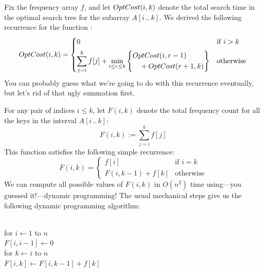 Fix the frequency array $f$, and let $OptCost(i, k)$ denote the total search time in the optimal search tree for the subarray $A[i\,..\,k]$.
We derived the following recurrence for the function :
\[
OptCost(i, k) = \begin{cases}
0 & \text{if } i > k\\[1ex]
\displaystyle\sum_{j=i}^{k} f[j] + \min_{i \le r \le k} \left\{\begin{aligned} &OptCost(i, r-1)\\ &\quad + OptCost(r+1, k) \end{aligned}\right\} & \text{otherwise}
\end{cases}
\]
You can probably guess what we’re going to do with this recurrence eventually, but let’s rid of that ugly summation first.

For any pair of indices $i \le k$, let $F(i, k)$ denote the total frequency count for all the keys in the interval $A[i\,..\,k]$:
\[
F(i, k) := \sum_{j=i}^{k} f[j]
\]
This function satisfies the following simple recurrence:
\[
F(i, k) = \begin{cases}
f[i] & \text{if } i = k\\
F(i, k-1) + f[k] & \text{otherwise}
\end{cases}
\]
We can compute all possible values of $F(i, k)$ in $O(n^2)$ time using---you guessed it!---dynamic programming!
The usual mechanical steps give us the following dynamic programming algorithm:

\begin{pseudocode}
\\
for $i \gets 1$ to $n$\\
\Indent $F[i, i-1] \gets 0$\\
\Indent for $k \gets i$ to $n$\\
\Indent\Indent $F[i, k] \gets F[i, k-1] + f[k]$
\end{pseudocode}

